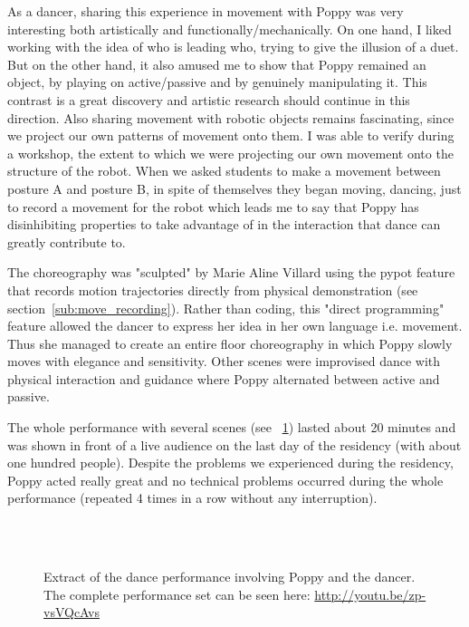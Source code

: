 \begin{formal}
    As a dancer, sharing this experience in movement with Poppy was very interesting both artistically and functionally/mechanically. On one hand, I liked working with the idea of who is leading who, trying to give the illusion of a duet. But on the other hand,  it also amused me to show that Poppy remained an object, by playing on active/passive and by genuinely manipulating it. This contrast is a great discovery and artistic research should continue in this direction.
    Also sharing movement with robotic objects remains fascinating, since we project our own patterns of movement onto them. I was able to verify during a workshop, the  extent to which we were projecting our own movement onto the structure of the robot. When we asked students to make a movement between posture A and posture B, in spite of themselves they began moving, dancing, just to record a movement for the robot which leads me to say that Poppy has disinhibiting properties to take advantage of in the interaction that dance can greatly contribute to.

\end{formal}

The choreography was "sculpted" by Marie Aline Villard using the pypot feature that records motion trajectories directly from physical demonstration (see section~\ref{sub:move_recording}). Rather than coding, this "direct programming" feature allowed the dancer to express her idea in her own language i.e. movement. Thus she managed to create an entire floor choreography in which Poppy slowly moves with elegance and sensitivity.
Other scenes were improvised dance with physical interaction and guidance where Poppy alternated between  active and passive.

The whole performance with several scenes (see \figurename~\ref{fig:poppy_dance_performance}) lasted about 20 minutes and was shown in front of a live audience on the last day of the residency (with about one hundred people). Despite the problems we experienced during the residency, Poppy acted really great and no technical problems occurred during the whole performance (repeated 4 times in a row without any interruption).

\begin{figure}[p]
\centering
    \hfill
    \\
    \hfill
    \\
    \caption{Extract of the dance performance involving Poppy and the dancer. The complete performance set can be seen here: \url{http://youtu.be/zp-vsVQcAvs}}
    \label{fig:poppy_dance_performance}
\end{figure}


